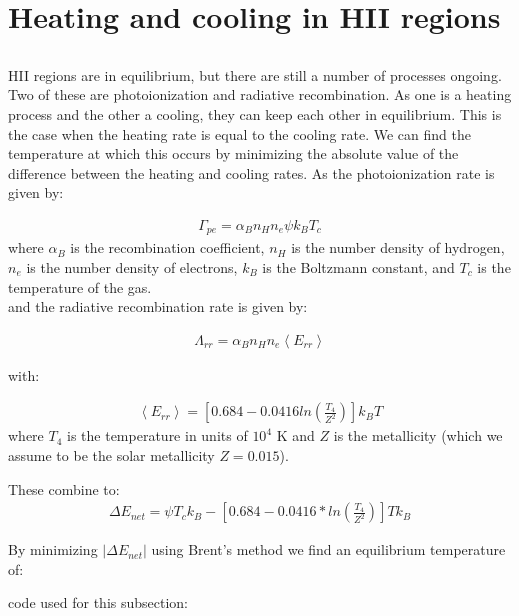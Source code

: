 \section{Heating and cooling in HII regions}

\subsection{}
HII regions are in equilibrium, but there are still a number of processes ongoing.
Two of these are photoionization and radiative recombination.
As one is a heating process and the other a cooling, they can keep each other in equilibrium.
This is the case when the heating rate is equal to the cooling rate.
We can find the temperature at which this occurs by minimizing the absolute value of the difference between the heating and cooling rates.
As the photoionization rate is given by:

\begin{align}
    \Gamma_{pe} = \alpha_B n_H n_e \psi k_B T_c
\end{align}
where $\alpha_B$ is the recombination coefficient, $n_H$ is the number density of hydrogen, $n_e$ is the number density of electrons, 
$k_B$ is the Boltzmann constant, and $T_c$ is the temperature of the gas.
\\
and the radiative recombination rate is given by:

\begin{align}
    \Lambda_{rr} = \alpha_B n_H n_e \left< E_{rr} \right>
\end{align}

with:

\begin{align}
    \left< E_{rr} \right> = \left[ 0.684 - 0.0416 ln\left( \frac{T_4}{Z^2} \right) \right] k_B T
\end{align}
where $T_4$ is the temperature in units of $10^4$ K and $Z$ is the metallicity (which we assume to be the solar metallicity $Z=0.015$).

These combine to:
\begin{align}
    \Delta E_{net} = \psi T_c k_B - \left[ 0.684 - 0.0416 * ln\left( \frac{T_4}{Z^2} \right) \right] T k_B
\end{align}

By minimizing $| \Delta E_{net} |$ using Brent's method we find an equilibrium temperature of:


code used for this subsection:


